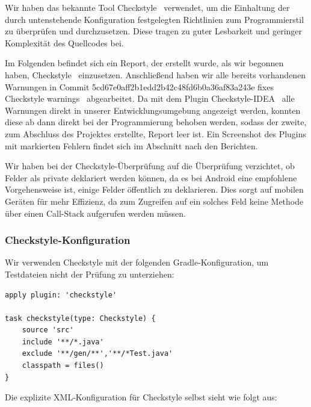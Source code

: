 Wir haben das bekannte Tool \glqq Checkstyle\grqq~ verwendet, um die Einhaltung der durch untenstehende Konfiguration festgelegten Richtlinien zum Programmierstil zu überprüfen und durchzusetzen. Diese tragen zu guter Lesbarkeit und geringer Komplexität des Quellcodes bei.

Im Folgenden befindet sich ein Report, der erstellt wurde, als wir begonnen haben, \glqq Checkstyle\grqq~ einzusetzen. Anschließend haben wir alle bereits vorhandenen Warnungen in Commit 5cd67e0aff2b1edd2b42c48fd6b0a36af83a243e \glqq fixes Checkstyle warnings\grqq~ abgearbeitet. Da mit dem Plugin \glqq Checkstyle-IDEA\grqq~ alle Warnungen direkt in unserer Entwicklungsumgebung angezeigt werden, konnten diese ab dann direkt bei der Programmierung behoben werden, sodass der zweite, zum Abschluss des Projektes erstellte, Report leer ist. Ein Screenshot des Plugins mit markierten Fehlern findet sich im Abschnitt nach den Berichten.

Wir haben bei der Checkstyle-Überprüfung auf die Überprüfung verzichtet, ob Felder als private deklariert werden können, da es bei Android eine empfohlene Vorgehensweise ist, einige Felder öffentlich zu deklarieren. Dies sorgt auf mobilen Geräten für mehr Effizienz, da zum Zugreifen auf ein solches Feld keine Methode über einen Call-Stack aufgerufen werden müssen.

\subsubsection{Checkstyle-Konfiguration}

Wir verwenden Checkstyle mit der folgenden Gradle-Konfiguration, um Testdateien nicht der Prüfung zu unterziehen:

\begin{lstlisting}
apply plugin: 'checkstyle'

task checkstyle(type: Checkstyle) {
    source 'src'
    include '**/*.java'
    exclude '**/gen/**','**/*Test.java'
    classpath = files()
}
\end{lstlisting}

Die explizite XML-Konfiguration für Checkstyle selbst sieht wie folgt aus:

